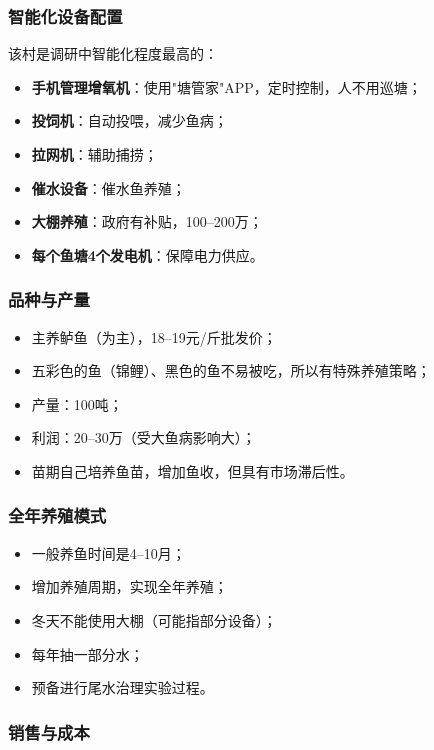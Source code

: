 \documentclass[12pt,a4paper]{article}
\begin{document}
\subsubsection{智能化设备配置}

该村是调研中智能化程度最高的：
\begin{itemize}[leftmargin=2em]
    \item \textbf{手机管理增氧机}：使用"塘管家"APP，定时控制，人不用巡塘；
    \item \textbf{投饲机}：自动投喂，减少鱼病；
    \item \textbf{拉网机}：辅助捕捞；
    \item \textbf{催水设备}：催水鱼养殖；
    \item \textbf{大棚养殖}：政府有补贴，100--200万；
    \item \textbf{每个鱼塘4个发电机}：保障电力供应。
\end{itemize}

\subsubsection{品种与产量}

\begin{itemize}[leftmargin=2em]
    \item 主养鲈鱼（为主），18--19元/斤批发价；
    \item 五彩色的鱼（锦鲤）、黑色的鱼不易被吃，所以有特殊养殖策略；
    \item 产量：100吨；
    \item 利润：20--30万（受大鱼病影响大）；
    \item 苗期自己培养鱼苗，增加鱼收，但具有市场滞后性。
\end{itemize}

\subsubsection{全年养殖模式}

\begin{itemize}[leftmargin=2em]
    \item 一般养鱼时间是4--10月；
    \item 增加养殖周期，实现全年养殖；
    \item 冬天不能使用大棚（可能指部分设备）；
    \item 每年抽一部分水；
    \item 预备进行尾水治理实验过程。
\end{itemize}

\subsubsection{销售与成本}
\end{document}
